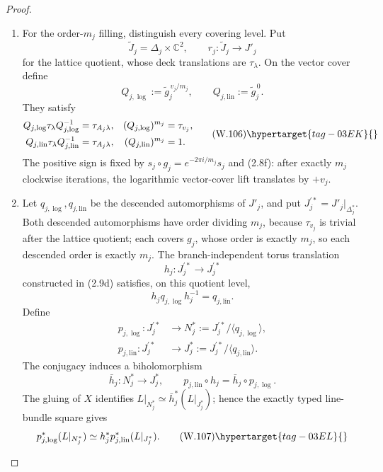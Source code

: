 \begin{proof}
\begin{enumerate}[label={$\langle1\rangle$\arabic*.},leftmargin=*]
\item For the order-\(m_j\) filling, distinguish every covering level.  Put
\[
 \widetilde J_j=\Delta_j\times\mathbb C^2,\qquad
 r_j:\widetilde J_j\longrightarrow J'_j
\]
for the lattice quotient, whose deck translations are \(\tau_\lambda\).
On the vector cover define
\[
 Q_{j,\log}:=\widetilde g_j^{\,v_j/m_j},\qquad
 Q_{j,\mathrm{lin}}:=\widetilde g_j^{\,0}.
\]
They satisfy
\[
\begin{aligned}
 Q_{j,\log}\tau_\lambda Q_{j,\log}^{-1}
  &=\tau_{A_j\lambda},&
 (Q_{j,\log})^{m_j}&=\tau_{v_j},\\
 Q_{j,\mathrm{lin}}\tau_\lambda Q_{j,\mathrm{lin}}^{-1}
  &=\tau_{A_j\lambda},&
 (Q_{j,\mathrm{lin}})^{m_j}&=1.
\end{aligned}
\tag{W.106}\hypertarget{tag-03EK}{}\label{wbII:eq:W:5.17-A14}
\]
The positive sign is fixed by
\(s_j\circ g_j=e^{-2\pi i/m_j}s_j\) and (2.8f): after exactly
\(m_j\) clockwise iterations, the logarithmic vector-cover lift translates
by \(+v_j\).

\item Let \(q_{j,\log},q_{j,\mathrm{lin}}\) be the descended automorphisms of \(J'_j\),
and put \(J_j^{\prime *}=J'_j|_{\Delta_j^*}\).  Both descended automorphisms have
order dividing \(m_j\), because \(\tau_{v_j}\) is trivial after the lattice
quotient; each covers \(g_j\), whose order is exactly \(m_j\), so each
descended order is exactly \(m_j\).
The branch-independent torus translation
\[
 h_j:J_j^{\prime *}\longrightarrow J_j^{\prime *}
\]
constructed in (2.9d) satisfies, on this quotient level,
\[
 h_jq_{j,\log}h_j^{-1}=q_{j,\mathrm{lin}}.
\]
Define
\[
\begin{aligned}
 p_{j,\log}:J_j^{\prime *}&\longrightarrow
  N_j^*:=J_j^{\prime *}/\langle q_{j,\log}\rangle,\\
 p_{j,\mathrm{lin}}:J_j^{\prime *}&\longrightarrow
 J_j^*:=J_j^{\prime *}/\langle q_{j,\mathrm{lin}}\rangle .
\end{aligned}
\]
The conjugacy induces a biholomorphism
\[
 \bar h_j:N_j^*\longrightarrow J_j^*,\qquad
 p_{j,\mathrm{lin}}\circ h_j=\bar h_j\circ p_{j,\log}.
\]
The gluing of \(X\) identifies
\(L|_{N_j^*}\simeq\bar h_j^*(L|_{J_j^*})\); hence the exactly typed
line-bundle square gives
\[
 p_{j,\log}^*(L|_{N_j^*})
 \simeq h_j^*p_{j,\mathrm{lin}}^*(L|_{J_j^*}).
\tag{W.107}\hypertarget{tag-03EL}{}\label{wbII:eq:W:5.17-A14a}
\]


\end{enumerate}
\end{proof}
